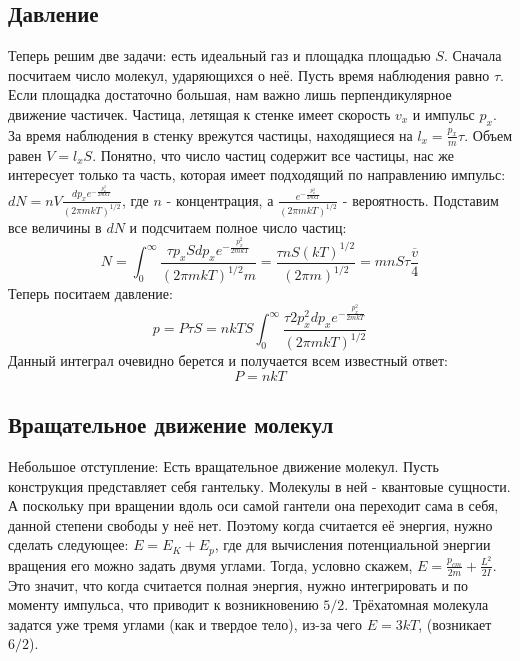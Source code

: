 \documentclass[a4paper, 12pt]{article}
\begin{document}
	\subsection{Давление}
	Теперь решим две задачи: есть идеальный газ и площадка площадью $S$. Сначала посчитаем число молекул, ударяющихся о неё. Пусть время наблюдения равно $\tau$. Если площадка достаточно большая, нам важно лишь перпендикулярное движение частичек. Частица, летящая к стенке имеет скорость $v_{x}$ и импульс $p_{x}$. За время наблюдения в стенку врежутся частицы, находящиеся на $l_{x} = \frac{p_{x}}{m} \tau$. Объем равен $V=l_{x} S$. Понятно, что число частиц содержит все частицы, нас же интересует только та часть, которая имеет подходящий по направлению импульс: $dN   = nV \frac{ dp_{x} e^{-\frac{p_{x}^2}{2mkT}}}{(2 \pi mkT)^{1/2}}$, где $n$ - концентрация, а $\frac{e^{-\frac{p_{x}^2}{2mkT}}}{(2 \pi mkT)^{1/2}}$ - вероятность.
	Подставим все величины в $dN$ и подсчитаем полное число частиц:
	\begin{equation*}
		N  = \int_0^{\infty}   \frac{ \tau p_{x} S dp_{x} e^{-\frac{p_{x}^2}{2mkT}}}{(2 \pi mkT)^{1/2} m } = \frac{\tau n S (kT)^{1/2}}{(2 \pi m )^{1/2}} = m n S \tau \frac{\overline{v}}{4}
	\end{equation*}
	Теперь поситаем давление:
	\begin{equation*}
		p = P \tau S  = nkTS \int_{0}^{\infty}  \frac{ \tau 2 p_{x}^{2} dp_{x} e^{-\frac{p_{x}^2}{2mkT}}}{(2 \pi mkT)^{1/2} }
	\end{equation*}
	Данный интеграл очевидно берется и получается всем известный ответ:
	\begin{equation*}
		P = nkT
	\end{equation*}
	\subsection{Вращательное движение молекул}
	Небольшое отступление: Есть вращательное движение молекул. Пусть конструкция представляет себя гантельку. Молекулы в ней - квантовые сущности. А поскольку при вращении вдоль оси самой гантели она переходит сама в себя, данной степени свободы у неё нет. Поэтому когда считается её энергия, нужно сделать следующее: $E = E_{K} + E_{p}$, где для вычисления потенциальной энергии вращения его можно задать двумя углами. Тогда, условно скажем, $E = \frac{p_{cm}}{2m} + \frac{L^2}{2I}$.  Это значит, что когда считается полная энергия, нужно интегрировать и по моменту импульса, что приводит к возникновению $5/2$. Трёхатомная молекула задатся уже тремя углами (как и твердое тело), из-за чего $E = 3kT$, (возникает $6/2$).
\end{document}
